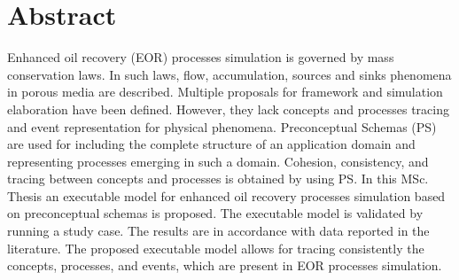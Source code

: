







\chapter*{Abstract}
Enhanced oil recovery (EOR) processes simulation is governed by mass conservation laws. In such laws, flow, accumulation, sources and sinks phenomena in porous media are described. Multiple proposals for framework and simulation elaboration have been defined. However, they lack concepts and processes tracing and event representation for physical phenomena. Preconceptual Schemas (PS) are used for including the complete structure of an application domain and representing processes emerging in such a domain. Cohesion, consistency, and tracing between concepts and processes is obtained by using PS. In this MSc. Thesis an executable model for enhanced oil recovery processes simulation based on preconceptual schemas is proposed. The executable model is validated by running a study case. The results are in accordance with data reported in the literature. The proposed executable model allows for tracing consistently the concepts, processes, and events, which are present in EOR processes simulation. \\

